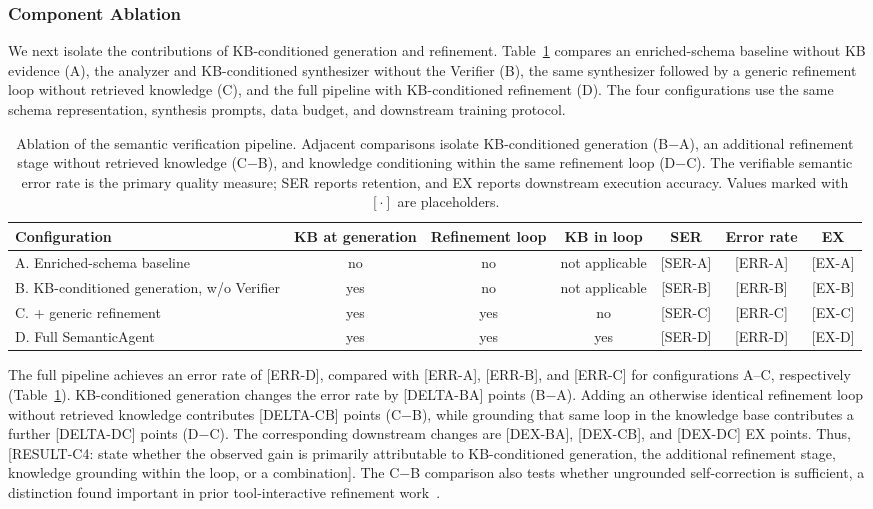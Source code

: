 \documentclass[letterpaper,journal]{IEEEtran}
\begin{document}
\subsubsection{Component Ablation}
\label{subsec:ablation}

We next isolate the contributions of KB-conditioned generation and refinement. Table~\ref{tab:ablation-ladder} compares an enriched-schema baseline without KB evidence (A), the analyzer and KB-conditioned synthesizer without the Verifier (B), the same synthesizer followed by a generic refinement loop without retrieved knowledge (C), and the full pipeline with KB-conditioned refinement (D). The four configurations use the same schema representation, synthesis prompts, data budget, and downstream training protocol.

\begin{table}[!t]
\centering
\caption{Ablation of the semantic verification pipeline. Adjacent comparisons isolate KB-conditioned generation (B$-$A), an additional refinement stage without retrieved knowledge (C$-$B), and knowledge conditioning within the same refinement loop (D$-$C). The verifiable semantic error rate is the primary quality measure; SER reports retention, and EX reports downstream execution accuracy. Values marked with $[\cdot]$ are placeholders.}
\label{tab:ablation-ladder}
\small
\setlength{\tabcolsep}{4pt}
\renewcommand{\arraystretch}{1.15}
\begin{tabular}{lcccccc}
\toprule
\textbf{Configuration} & \textbf{KB at generation} & \textbf{Refinement loop} & \textbf{KB in loop} & \textbf{SER} & \textbf{Error rate} & \textbf{EX} \\
\midrule
A. Enriched-schema baseline & no & no & not applicable & [SER-A] & [ERR-A] & [EX-A] \\
B. KB-conditioned generation, w/o Verifier & yes & no & not applicable & [SER-B] & [ERR-B] & [EX-B] \\
C. + generic refinement & yes & yes & no & [SER-C] & [ERR-C] & [EX-C] \\
D. Full SemanticAgent & yes & yes & yes & [SER-D] & [ERR-D] & [EX-D] \\
\bottomrule
\end{tabular}
\end{table}

The full pipeline achieves an error rate of [ERR-D], compared with [ERR-A], [ERR-B], and [ERR-C] for configurations A--C, respectively (Table~\ref{tab:ablation-ladder}). KB-conditioned generation changes the error rate by [DELTA-BA] points (B$-$A). Adding an otherwise identical refinement loop without retrieved knowledge contributes [DELTA-CB] points (C$-$B), while grounding that same loop in the knowledge base contributes a further [DELTA-DC] points (D$-$C). The corresponding downstream changes are [DEX-BA], [DEX-CB], and [DEX-DC] EX points. Thus, [RESULT-C4: state whether the observed gain is primarily attributable to KB-conditioned generation, the additional refinement stage, knowledge grounding within the loop, or a combination]. The C$-$B comparison also tests whether ungrounded self-correction is sufficient, a distinction found important in prior tool-interactive refinement work~\cite{gou2024critic}.
\end{document}
